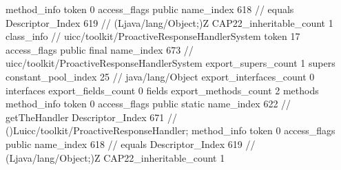 {{{{{				}
				method_info {
					token	0
					access_flags	public
					name_index	618		// equals
					Descriptor_Index	619		// (Ljava/lang/Object;)Z
				}
			}
			CAP22_inheritable_count	1
		}
		class_info {		// uicc/toolkit/ProactiveResponseHandlerSystem
			token	17
			access_flags	public final
			name_index	673		// uicc/toolkit/ProactiveResponseHandlerSystem
			export_supers_count	1
			supers {
				constant_pool_index	25		// java/lang/Object
			}
			export_interfaces_count	0
			interfaces {
			}
			export_fields_count	0
			fields {
			}
			export_methods_count	2
			methods {
				method_info {
					token	0
					access_flags	public static
					name_index	622		// getTheHandler
					Descriptor_Index	671		// ()Luicc/toolkit/ProactiveResponseHandler;
				}
				method_info {
					token	0
					access_flags	public
					name_index	618		// equals
					Descriptor_Index	619		// (Ljava/lang/Object;)Z
				}
			}
			CAP22_inheritable_count	1
		}
	}
}
